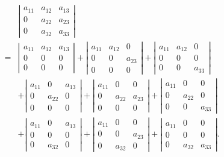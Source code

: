 \documentclass[UTF8,12pt,a4paper,fontset=fandol]{ctexart}
\begin{document}
\[
\begin{aligned}
&\left|\begin{array}{ccc}
a_{11} & a_{12} & a_{13}\\
0 & a_{22} & a_{23}\\
0 & a_{32} & a_{33}
\end{array}\right|\\
={}&
\left|\begin{array}{ccc}a_{11}&a_{12}&a_{13}\\0&0&0\\0&0&0\end{array}\right|
+
\left|\begin{array}{ccc}a_{11}&a_{12}&0\\0&0&a_{23}\\0&0&0\end{array}\right|
+
\left|\begin{array}{ccc}a_{11}&a_{12}&0\\0&0&0\\0&0&a_{33}\end{array}\right|\\
&+
\left|\begin{array}{ccc}a_{11}&0&a_{13}\\0&a_{22}&0\\0&0&0\end{array}\right|
+
\left|\begin{array}{ccc}a_{11}&0&0\\0&a_{22}&a_{23}\\0&0&0\end{array}\right|
+
\left|\begin{array}{ccc}a_{11}&0&0\\0&a_{22}&0\\0&0&a_{33}\end{array}\right|\\
&+
\left|\begin{array}{ccc}a_{11}&0&a_{13}\\0&0&0\\0&a_{32}&0\end{array}\right|
+
\left|\begin{array}{ccc}a_{11}&0&0\\0&0&a_{23}\\0&a_{32}&0\end{array}\right|
+
\left|\begin{array}{ccc}a_{11}&0&0\\0&0&0\\0&a_{32}&a_{33}\end{array}\right|.
\end{aligned}
\]
\end{document}
